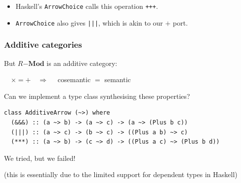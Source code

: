 \documentclass[10pt]{beamer}
\begin{document}
\begin{frame}
\begin{center}
  \end{center}

  \begin{itemize}
  \item Haskell's \lstinline{ArrowChoice} calls this operation
    \alert{\lstinline{+++}}.
  \item \lstinline{ArrowChoice} also gives \alert{\lstinline{|||}},
    which is akin to our \alert{$+$} port.
  \end{itemize}
\end{frame}


\lstset{basicstyle=\ttfamily\small}
\lstset{language=Haskell}

\begin{frame}[fragile]
  \frametitle{Additive categories}

  \begin{center}
    \large
    But $R\mathbf{-Mod}$ is an \alert{additive} category:

    $\quad\times=+\quad\Rightarrow\quad$  cosemantic $=$ semantic
  \end{center}

  \begin{block}{Can we implement a type class synthesising these properties?}
\begin{lstlisting}
class AdditiveArrow (~>) where
  (&&&) :: (a ~> b) -> (a ~> c) -> (a ~> (Plus b c))
  (|||) :: (a ~> c) -> (b ~> c) -> ((Plus a b) ~> c)
  (***) :: (a ~> b) -> (c ~> d) -> ((Plus a c) ~> (Plus b d))
\end{lstlisting}
  \end{block}

  \pause
  
  \begin{center}
    \Large
    We tried, but we failed!

    \normalsize (this is essentially due to the limited support for
    dependent types in Haskell)
  \end{center}
  
\end{frame}
\end{document}
